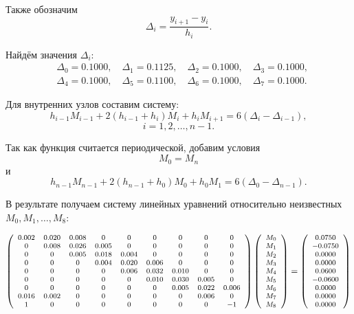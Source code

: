 Также обозначим
\[
\Delta_i=\frac{y_{i+1}-y_i}{h_i}.
\]

Найдём значения $\Delta_i$:
\[
\begin{aligned}
&\Delta_0=0.1000, \quad \Delta_1=0.1125, \quad \Delta_2=0.1000, \quad \Delta_3=0.1000,\\
&\Delta_4=0.1000, \quad \Delta_5=0.1100, \quad \Delta_6=0.1000, \quad \Delta_7=0.1000.
\end{aligned}
\]

Для внутренних узлов составим систему:
\[
h_{i-1}M_{i-1}+2(h_{i-1}+h_i)M_i+h_iM_{i+1}
=
6(\Delta_i-\Delta_{i-1}),
\]
\[
i=1,2,\dots,n-1.
\]

Так как функция считается периодической, добавим условия
\[
M_0=M_n
\]
и
\[
h_{n-1}M_{n-1}+2(h_{n-1}+h_0)M_0+h_0M_1
=
6(\Delta_0-\Delta_{n-1}).
\]

В результате получаем систему линейных уравнений относительно неизвестных
$M_0,M_1,\dots,M_8$:

\[
{\footnotesize
\left(
\begin{array}{ccccccccc}
0.002 & 0.020 & 0.008 & 0 & 0 & 0 & 0 & 0 & 0 \\
0 & 0.008 & 0.026 & 0.005 & 0 & 0 & 0 & 0 & 0 \\
0 & 0 & 0.005 & 0.018 & 0.004 & 0 & 0 & 0 & 0 \\
0 & 0 & 0 & 0.004 & 0.020 & 0.006 & 0 & 0 & 0 \\
0 & 0 & 0 & 0 & 0.006 & 0.032 & 0.010 & 0 & 0 \\
0 & 0 & 0 & 0 & 0 & 0.010 & 0.030 & 0.005 & 0 \\
0 & 0 & 0 & 0 & 0 & 0 & 0.005 & 0.022 & 0.006 \\
0.016 & 0.002 & 0 & 0 & 0 & 0 & 0 & 0.006 & 0 \\
1 & 0 & 0 & 0 & 0 & 0 & 0 & 0 & -1
\end{array}
\right)
\left(
\begin{array}{c}
M_0\\M_1\\M_2\\M_3\\M_4\\M_5\\M_6\\M_7\\M_8
\end{array}
\right)
=
\left(
\begin{array}{c}
0.0750\\-0.0750\\0.0000\\0.0000\\0.0600\\-0.0600\\0.0000\\0.0000\\0.0000
\end{array}
\right)
}
\]

